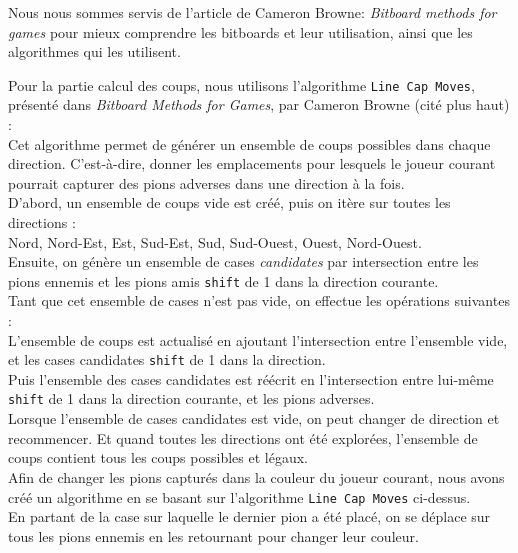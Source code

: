 \documentclass[a4paper,12pt]{article}
\begin{document}
\newpage

Nous nous sommes servis de l'article de Cameron Browne: \textit{Bitboard
    methods for games}\cite{BitboardMethods} pour mieux comprendre les bitboards et
leur utilisation, ainsi que les algorithmes qui les utilisent.\\

\vspace{0.5cm}

Pour la partie calcul des coups, nous utilisons l’algorithme \texttt{Line Cap
    Moves}, présenté dans \textit{Bitboard Methods for Games}, par Cameron Browne
(cité plus haut) :\\ Cet algorithme permet de générer un ensemble de coups
possibles dans chaque direction. C’est-à-dire, donner les emplacements pour
lesquels le joueur courant pourrait capturer des pions adverses dans une
direction à la fois.\\

D’abord, un ensemble de coups vide est créé, puis on itère sur toutes les
directions :\\ Nord, Nord-Est, Est, Sud-Est, Sud, Sud-Ouest, Ouest,
Nord-Ouest.\\ Ensuite, on génère un ensemble de cases \textit{candidates} par
intersection entre les pions ennemis et les pions amis \texttt{shift} de 1 dans
la direction courante.\\ Tant que cet ensemble de cases n’est pas vide, on
effectue les opérations suivantes :\\ L’ensemble de coups est actualisé en
ajoutant l’intersection entre l’ensemble vide, et les cases candidates
\texttt{shift} de 1 dans la direction.\\ Puis l’ensemble des cases candidates
est réécrit en l’intersection entre lui-même \texttt{shift} de 1 dans la
direction courante, et les pions adverses.\\ Lorsque l’ensemble de cases
candidates est vide, on peut changer de direction et recommencer. Et quand
toutes les directions ont été explorées, l’ensemble de coups contient tous les
coups possibles et légaux.\\ Afin de changer les pions capturés dans la couleur
du joueur courant, nous avons créé un algorithme en se basant sur l’algorithme
\texttt{Line Cap Moves} ci-dessus.\\ En partant de la case sur laquelle le
dernier pion a été placé, on se déplace sur tous les pions ennemis en les
retournant pour changer leur couleur.\\
\end{document}
